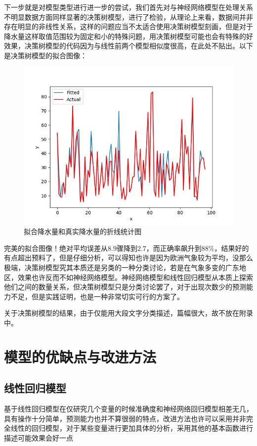 \documentclass[UTF8, a4paper]{ctexart}
\begin{document}
下一步就是对模型类型进行进一步的尝试，我们首先对与神经网络模型在处理关系不明显数据方面同样显著的决策树模型，进行了检验，从理论上来看，数据间并非存在明显的非线性关系，这样的问题应当不太适合使用决策树模型刻画，但是对于降水量这样取值范围较为固定和小的特殊问题，用决策树模型可能也会有特殊的好效果，决策树模型的代码因为与线性前两个模型相似度很高，在此处不贴出。以下是决策树模型的拟合图像：

\begin{figure}[h!]
	\centering
	\includegraphics[scale=0.5]{very_success.png}
	\caption{拟合降水量和真实降水量的折线统计图}
\end{figure}

完美的拟合图像！绝对平均误差从$8.9$骤降到$2.7$，而正确率飙升到$88\%$，结果好的有点超出预料了，但是仔细分析，可以得知也许是因为欧洲气象较为平均，没那么极端，决策树模型究其本质还是另类的一种分类讨论，若是在气象多变的广东地区，效果也许反而不如神经网络模型。神经网络模型和线性回归模型从本质上探索他们之间的数量关系，但决策树模型只是分类讨论罢了，对于出现次数少的预测能力不足，但是实践证明，也是一种非常切实可行的方案了。

关于决策树模型的结果，由于仅能用大段文字分类描述，篇幅很大，故不放在附录中。

\newpage

\section{模型的优缺点与改进方法}

\subsection{线性回归模型}
基于线性回归模型在仅研究几个变量的时候准确度和神经网络回归模型相差无几，具有操作十分简单，预测能力也并不算很弱的特点，改进方法也许可以采用并非完全线性的回归模型，对于某些变量进行更加具体的分析，采用其他的基本函数进行描述可能效果会好一点
\end{document}
